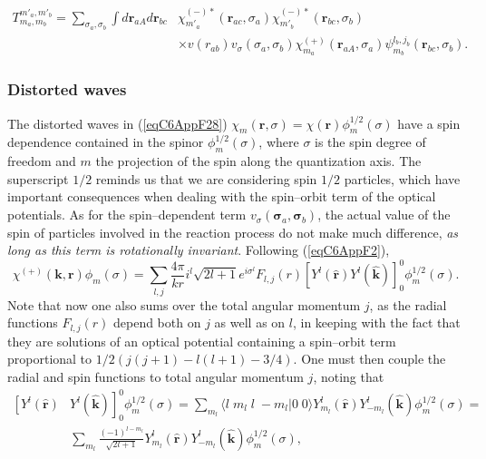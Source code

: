 \begin{equation}\label{eqC6AppF28}
\begin{split}
T_{m_a,m_b}^{m'_a,m'_b}=\sum_{\sigma_a,\sigma_b}\int d\mathbf{r}_{aA}d \mathbf{r}_{bc}&\chi^{(-)*}_{m'_a}(\mathbf{r}_{ac},\sigma_a)\chi^{(-)*}_{m'_b}(\mathbf{r}_{bc},\sigma_b)\\
&\times v(r_{ab})v_\sigma(\sigma_a,\sigma_b)\chi^{(+)}_{m_a}(\mathbf{r}_{aA},\sigma_a)\psi_{m_b}^{l_b,j_b}(\mathbf{r}_{bc},\sigma_b).
\end{split}
\end{equation}
\subsubsection{Distorted waves}
The distorted waves in (\ref{eqC6AppF28}) $\chi_{m}(\mathbf{r},\sigma)=\chi(\mathbf{r})\phi^{1/2}_m(\sigma)$ have a spin dependence contained in the spinor $\phi^{1/2}_m(\sigma)$, where $\sigma$ is the spin degree of freedom and $m$ the projection of the spin along the quantization axis. The superscript $1/2$ reminds us that we are considering spin $1/2$ particles, which have important consequences when dealing with the spin--orbit term of the optical potentials. As for the spin--dependent term $v_\sigma(\boldsymbol\sigma_a,\boldsymbol\sigma_b)$, the actual value of the spin of  particles involved in the reaction process do not make much difference, \emph{as long as this term is rotationally invariant}. Following (\ref{eqC6AppF2}),
 \begin{equation}\label{eqC6AppG29}
\chi^{(+)}(\mathbf{k},\mathbf{r})\phi_m(\sigma)= \sum_{l,j}\frac{4\pi}{k r} i^{l}\sqrt{2l+1}
e^{i\sigma^{l}} F_{l,j}(r) \left[ Y^{l} (\hat {\mathbf{r}}) Y^{l} (\hat {\mathbf{k}})\right]^0_0\phi^{1/2}_m(\sigma).
\end{equation}
Note that now one  also sums over the total angular momentum $j$, as the radial functions $F_{l,j}(r)$ depend both on $j$ as well as on $l$, in keeping with the fact that they are solutions of an optical potential containing a spin--orbit term proportional to $1/2\left(j(j+1)-l(l+1)-3/4\right)$. One must then couple the radial and spin functions to total angular momentum $j$, noting that 
 \begin{equation}\label{eqC6AppG30}
 \begin{split}
\left[ Y^{l} (\hat {\mathbf{r}}) \right. & \left. Y^{l} (\hat {\mathbf{k}})\right]^0_0\phi^{1/2}_m(\sigma)=\sum_{m_l} \langle l\;m_l\;l\;-m_l|0\;0\rangle Y^{l}_{m_l} (\hat {\mathbf{r}})Y^{l}_{-m_l} (\hat {\mathbf{k}})\phi^{1/2}_m(\sigma)=\\
&\sum_{m_l} \frac{(-1)^{l-m_l}}{\sqrt{2l+1}} Y^{l}_{m_l} (\hat {\mathbf{r}})Y^{l}_{-m_l} (\hat {\mathbf{k}})\phi^{1/2}_m(\sigma),
 \end{split}
\end{equation}
